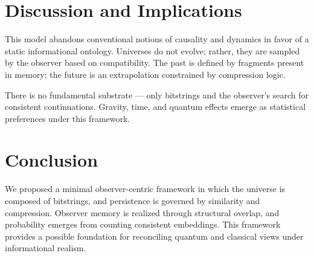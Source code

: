 \documentclass[12pt]{article}
\begin{document}
\section{Discussion and Implications}

This model abandons conventional notions of causality and dynamics in favor of a static informational ontology. Universes do not evolve; rather, they are sampled by the observer based on compatibility. The past is defined by fragments present in memory; the future is an extrapolation constrained by compression logic.

There is no fundamental substrate — only bitstrings and the observer's search for consistent continuations. Gravity, time, and quantum effects emerge as statistical preferences under this framework.

\section{Conclusion}

We proposed a minimal observer-centric framework in which the universe is composed of bitstrings, and persistence is governed by similarity and compression. Observer memory is realized through structural overlap, and probability emerges from counting consistent embeddings. This framework provides a possible foundation for reconciling quantum and classical views under informational realism.
\end{document}
